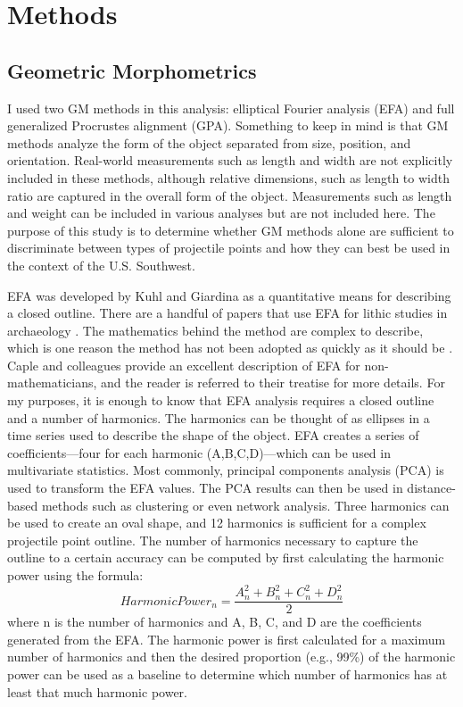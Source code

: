 \documentclass[letterpaper]{article}
\begin{document}
\hypertarget{methods}{%
\section*{Methods}\label{methods}}

\hypertarget{geometric-morphometrics}{%
\subsection*{Geometric Morphometrics}\label{geometric-morphometrics}}

I used two GM methods in this analysis: elliptical Fourier analysis (EFA) and full generalized Procrustes alignment (GPA). Something to keep in mind is that GM methods analyze the form of the object separated from size, position, and orientation. Real-world measurements such as length and width are not explicitly included in these methods, although relative dimensions, such as length to width ratio are captured in the overall form of the object. Measurements such as length and weight can be included in various analyses but are not included here. The purpose of this study is to determine whether GM methods alone are sufficient to discriminate between types of projectile points and how they can best be used in the context of the U.S. Southwest.

EFA was developed by Kuhl and Giardina \autocite*{Kuhl1982-kd} as a quantitative means for describing a closed outline. There are a handful of papers that use EFA for lithic studies in archaeology \autocites[e.g.,][]{Cardillo2010-ys,Fox2015-ox,Gingerich2014-cb,Hoggard2019-yw,Iovita2011-nz,Iovita2011-zp,Matzig2021-id}. The mathematics behind the method are complex to describe, which is one reason the method has not been adopted as quickly as it should be \autocite[see][]{Caple2017-mk}. Caple and colleagues \autocite*{Caple2017-mk} provide an excellent description of EFA for non-mathematicians, and the reader is referred to their treatise for more details. For my purposes, it is enough to know that EFA analysis requires a closed outline and a number of harmonics. The harmonics can be thought of as ellipses in a time series used to describe the shape of the object. EFA creates a series of coefficients---four for each harmonic (A,B,C,D)---which can be used in multivariate statistics. Most commonly, principal components analysis (PCA) is used to transform the EFA values. The PCA results can then be used in distance-based methods such as clustering or even network analysis. Three harmonics can be used to create an oval shape, and 12 harmonics is sufficient for a complex projectile point outline. The number of harmonics necessary to capture the outline to a certain accuracy can be computed by first calculating the harmonic power using the formula: \[ HarmonicPower_n = \frac{A^2_n+B^2_n+C^2_n+D^2_n}{2} \] where n is the number of harmonics and A, B, C, and D are the coefficients generated from the EFA. The harmonic power is first calculated for a maximum number of harmonics and then the desired proportion (e.g., 99\%) of the harmonic power can be used as a baseline to determine which number of harmonics has at least that much harmonic power.
\end{document}

